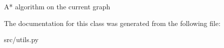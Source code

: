 \begin{DoxyVerb}A* algorithm on the current graph \end{DoxyVerb}
 

\-The documentation for this class was generated from the following file\-:\begin{DoxyCompactItemize}
\item 
src/utils.\-py\end{DoxyCompactItemize}
